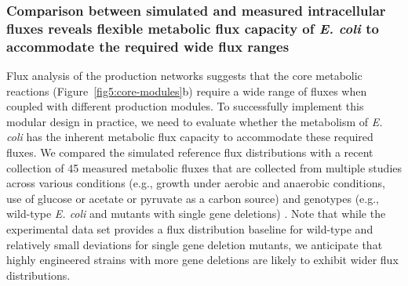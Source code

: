 \subsubsection{Comparison between simulated and measured intracellular fluxes reveals flexible metabolic flux capacity of \textit{E. coli} to accommodate the required wide flux ranges} \label{sec:flux_comparison}

Flux analysis of the production networks suggests that the core metabolic reactions (Figure~\ref{fig5:core-modules}b) require a wide range of fluxes when coupled with different production modules. To successfully implement this modular design in practice, we need to evaluate whether the metabolism of \textit{E. coli} has the inherent metabolic flux capacity to accommodate these required fluxes.
We compared the simulated reference flux distributions with a recent collection of 45 measured metabolic fluxes \citep{khodayari2016} that are collected from multiple studies across various conditions (e.g., growth under aerobic and anaerobic conditions, use of glucose or acetate or pyruvate as a carbon source) and genotypes (e.g., wild-type \textit{E. coli} and mutants with single gene deletions) \citep{ishii2007, kabir2005, zhao2004, zhao2003}.
Note that while the experimental data set provides a flux distribution baseline for wild-type and relatively small deviations for single gene deletion mutants, we anticipate that highly engineered strains with more gene deletions are likely to exhibit wider flux distributions.

